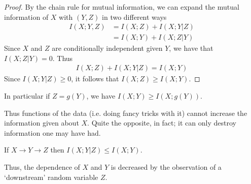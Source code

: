 \begin{proof}
	By the chain rule for mutual information, we can expand the mutual information of $X$ with $(Y,Z)$ in two different ways
	\begin{align}
		I(X;Y,Z) &= I(X;Z)+I(X;Y|Z) \\
				 &= I(X;Y)+I(X;Z|Y)
	\end{align}	
Since $X$ and $Z$ are conditionally independent given $Y$, we have that $I(X;Z|Y) = 0$. Thus
\begin{align}
	I(X;Z) + I(X;Y|Z) = I(X;Y)
\end{align}
Since $I(X;Y|Z) \geq 0$, it follows that $I(X;Z) \geq I(X;Y)$. 
\end{proof}
\begin{corollary}
	In particular if $Z = g(Y)$, we have $I(X;Y) \geq I(X;g(Y))$. 
\end{corollary}
Thus functions of the data (i.e. doing fancy tricks with it) cannot increase the information given about $X$. Quite the opposite, in fact; it can only destroy information one may have had. 
\begin{corollary}
	If $X \to Y \to Z$ then $I(X;Y|Z) \leq I(X;Y)$.
\end{corollary}
Thus, the dependence of $X$ and $Y$ is decreased by the observation of a `downstream' random variable $Z$. 
